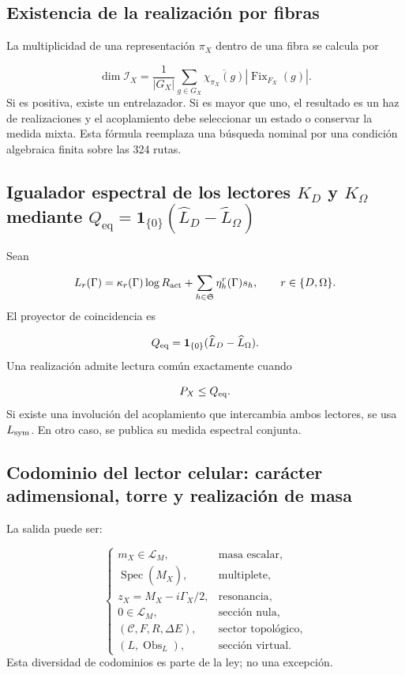 \subsection{Existencia de la realización por fibras}
La multiplicidad de una representación \(\pi_X\) dentro de una fibra se calcula por

\[
 \dim\mathscr I_X=
 \frac1{|G_X|}
 \sum_{g\in G_X}
 \overline{\chi_{\pi_X}(g)}
 |\operatorname{Fix}_{F_X}(g)|.
\]
Si es positiva, existe un entrelazador. Si es mayor que uno, el resultado es un haz de realizaciones y el acoplamiento debe seleccionar un estado o conservar la medida mixta. Esta fórmula reemplaza una búsqueda nominal por una condición algebraica finita sobre las 324 rutas.

\subsection{Igualador espectral de los lectores \(K_D\) y \(K_\Omega\) mediante \(Q_{\mathrm{eq}}=\mathbf1_{\{0\}}(\widehat L_D-\widehat L_\Omega)\)}
Sean

\[
 L_r(\Gamma)=
 \kappa_r(\Gamma)\log R_{\rm act}
 +\sum_{h\in\mathfrak S}\eta_h^r(\Gamma)s_h,
 \qquad r\in\{D,\Omega\}.
\]
El proyector de coincidencia es

\[
 Q_{\rm eq}=
 \mathbf1_{\{0\}}(\widehat L_D-\widehat L_\Omega).
\]
Una realización admite lectura común exactamente cuando

\[
 P_X\le Q_{\rm eq}.
\]
Si existe una involución del acoplamiento que intercambia ambos lectores, se usa \(L_{\rm sym}\). En otro caso, se publica su medida espectral conjunta.

\subsection{Codominio del lector celular: carácter adimensional, torre y realización de masa}
La salida puede ser:

\[
 \begin{cases}
 m_X\in\mathcal L_M,&\text{masa escalar},\\
 \operatorname{Spec}(\widehat M_X),&\text{multiplete},\\
 z_X=M_X-i\Gamma_X/2,&\text{resonancia},\\
 0\in\mathcal L_M,&\text{sección nula},\\
 (\mathcal C,F,R,\Delta E),&\text{sector topológico},\\
 (L,\operatorname{Obs}_L),&\text{sección virtual}.
 \end{cases}
\]
Esta diversidad de codominios es parte de la ley; no una excepción.


